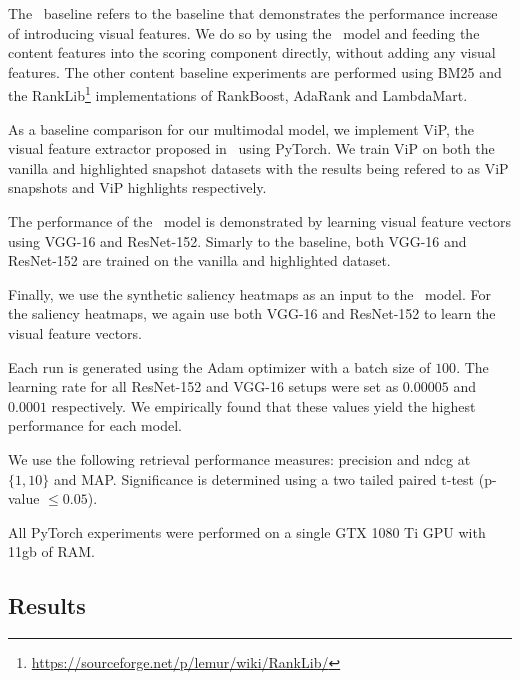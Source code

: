 The \modelname~baseline refers to the baseline that demonstrates the performance increase of introducing visual features. We do so by using the \modelname~model and feeding the content features into the scoring component directly, without adding any visual features. 
The other content baseline experiments are performed using BM25 and the RankLib\footnote{\url{https://sourceforge.net/p/lemur/wiki/RankLib/}} implementations of RankBoost, AdaRank and LambdaMart.

As a baseline comparison for our multimodal model, we implement ViP, the visual feature extractor proposed in~\citet{fan2017learning} using PyTorch. We train ViP on both the vanilla and highlighted snapshot datasets with the results being refered to as ViP snapshots and ViP highlights respectively.

The performance of the \modelname~model is demonstrated by learning visual feature vectors using VGG-16 and ResNet-152. Simarly to the baseline, both VGG-16 and ResNet-152 are trained on the vanilla and highlighted dataset. 

Finally, we use the synthetic saliency heatmaps as an input to the \modelname~model. For the saliency heatmaps, we again use both VGG-16 and ResNet-152 to learn the visual feature vectors.

Each run is generated using the Adam optimizer with a batch size of $100$. The learning rate for all ResNet-152 and VGG-16 setups were set as $0.00005$ and $0.0001$ respectively. We empirically found that these values yield the highest performance for each model.

We use the following retrieval performance measures: precision and ndcg at $\{1,10\}$ and MAP.
Significance is determined using a two tailed paired t-test (p-value $\leq 0.05$). 

All PyTorch experiments were performed on a single GTX 1080 Ti GPU with 11gb of RAM. 


\subsection{Results}


